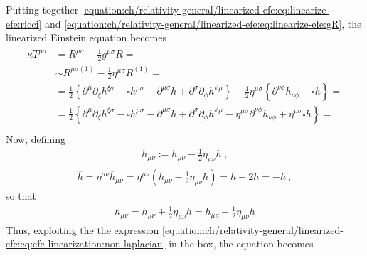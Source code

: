 \documentclass[letterpaper,10pt,english]{jupyterBook}
\begin{document}
\sphinxAtStartPar
Putting together \eqref{equation:ch/relativity-general/linearized-efe:eq:linearize-efe:ricci} and \eqref{equation:ch/relativity-general/linearized-efe:eq:linearize-efe:gR}, the linearized Einstein equation becomes
\begin{equation*}
\begin{split}\begin{aligned}
 \kappa T^{\mu \sigma}
 & = R^{\mu \sigma} - \frac{1}{2} g^{\mu \sigma} R = \\
 & \sim R^{\mu \sigma (1)} - \frac{1}{2} \eta^{\mu \sigma} R^{(1)} = \\
 & = \frac{1}{2} \left\{ \partial^{\mu} \partial_{\xi} h^{\xi \sigma} - \square h^{\mu \sigma} - \partial^{\mu \sigma} h + \partial^{\sigma} \partial_{\phi} h^{\phi \mu} \right\} - \frac{1}{2} \eta^{\mu \sigma} \left\{ \partial^{\nu \phi} h_{\nu \phi} - \square h \right\} = \\
 & = \frac{1}{2} \left\{ \partial^{\mu} \partial_{\xi} h^{\xi \sigma} - \square h^{\mu \sigma} - \partial^{\mu \sigma} h + \partial^{\sigma} \partial_{\phi} h^{\phi \mu} - \eta^{\mu \sigma} \partial^{\nu \phi} h_{\nu \phi} + \eta^{\mu \sigma} \square h \right\} = \\
\end{aligned}\end{split}
\end{equation*}
\sphinxAtStartPar
Now, defining
\begin{equation*}
\begin{split}\overline{h}_{\mu \nu} := h_{\mu \nu} - \frac{1}{2} \eta_{\mu \nu} h \ ,\end{split}
\end{equation*}\begin{equation*}
\begin{split}\overline{h} = \eta^{\mu \nu} \overline{h}_{\mu \nu} = \eta^{\mu \nu} \left( h_{\mu \nu} - \frac{1}{2} \eta_{\mu \nu} h \right) = h - 2 h = - h \ ,\end{split}
\end{equation*}
\sphinxAtStartPar
so that
\begin{equation*}
\begin{split}h_{\mu \nu} = \overline{h}_{\mu \nu} + \frac{1}{2} \eta_{\mu \nu} h = \overline{h}_{\mu \nu} - \frac{1}{2} \eta_{\mu \nu} \overline{h} \end{split}
\end{equation*}
\sphinxAtStartPar
Thus, exploiting the the expression \eqref{equation:ch/relativity-general/linearized-efe:eq:efe-linearization:non-laplacian} in the box, the equation becomes
\end{document}
